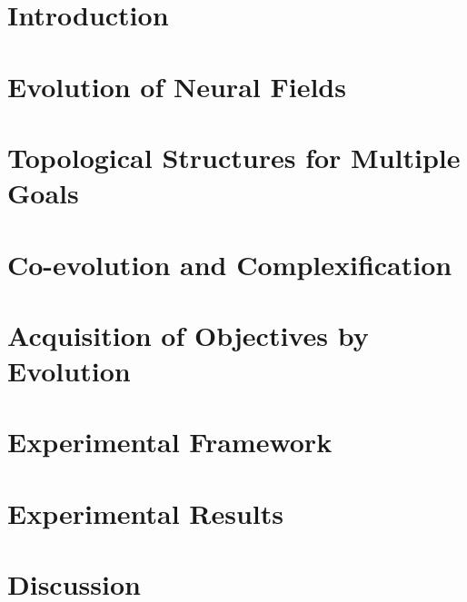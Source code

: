 \section{Introduction} 
\label{sec:chp3-introduction}

\section{Evolution of Neural Fields}
\label{sec:chp3-evolution}

\section{Topological Structures for Multiple Goals}
\label{sec:chp3-topological}


\section{Co-evolution and Complexification}
\label{sec:chp3-coevolution}

\section{Acquisition of Objectives by Evolution}
\label{sec:chp3-acquisition}

\section{Experimental Framework}
\label{sec:chp3-experimental}

\section{Experimental Results}
\label{sec:chp3-results}

\section{Discussion}
\label{sec:chp3-discussion}